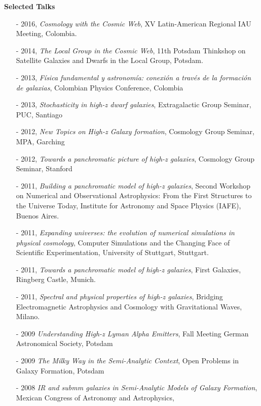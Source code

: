 \documentclass[letterpaper,11pt,onecolumn]{article}
\begin{document}
{\bf Selected Talks}
\begin{itemize} 
\item [-] 2016, {\it Cosmology with the Cosmic Web}, XV Latin-American
  Regional IAU Meeting, Colombia.
\item [-] 2014, {\it The Local Group in the Cosmic Web}, 11th Potsdam
  Thinkshop on Satellite Galaxies and Dwarfs in the Local Group,
  Potsdam.
\item [-] 2013, {\it F\'isica fundamental y astronom\'ia: conexi\'on a trav\'es de la formaci\'on de galaxias}, Colombian Physics Conference, Colombia
\item [-] 2013, {\it Stochasticity in high-z dwarf galaxies},
  Extragalactic Group Seminar, PUC, Santiago
\item [-] 2012, {\it New Topics on High-z Galaxy formation}, Cosmology
  Group Seminar, MPA, Garching 
\item [-] 2012, {\it Towards a panchromatic picture of high-z
  galaxies}, Cosmology Group Seminar, Stanford 
\item [-] 2011, {\it Building a panchromatic model of high-z
  galaxies}, Second Workshop on Numerical and Observational
  Astrophysics: From the First Structures to the Universe Today,
  Institute for Astronomy and Space Physics (IAFE), Buenos Aires. 
\item [-] 2011, {\it Expanding universes: the evolution of numerical
  simulations in physical cosmology}, Computer Simulations and the
  Changing Face of Scientific Experimentation, University of
  Stuttgart, Stuttgart. 
\item [-] 2011, {\it Towards a panchromatic model of high-z galaxies}, First
  Galaxies, Ringberg Castle, Munich.  
\item [-] 2011, {\it Spectral and physical properties of high-z galaxies},
  Bridging Electromagnetic Astrophysics and Cosmology with Gravitational
  Waves, Milano.
\item [-] 2009 {\it Understanding High-z Lyman Alpha Emitters}, Fall
  Meeting German Astronomical Society, Potsdam 
\item [-] 2009 {\it The Milky Way in the Semi-Analytic Context}, Open
  Problems in Galaxy Formation, Potsdam 
\item [-] 2008 {\it IR and submm galaxies in Semi-Analytic Models of
  Galaxy Formation}, Mexican Congress of Astronomy and Astrophysics,

\end{itemize}
\end{document}
